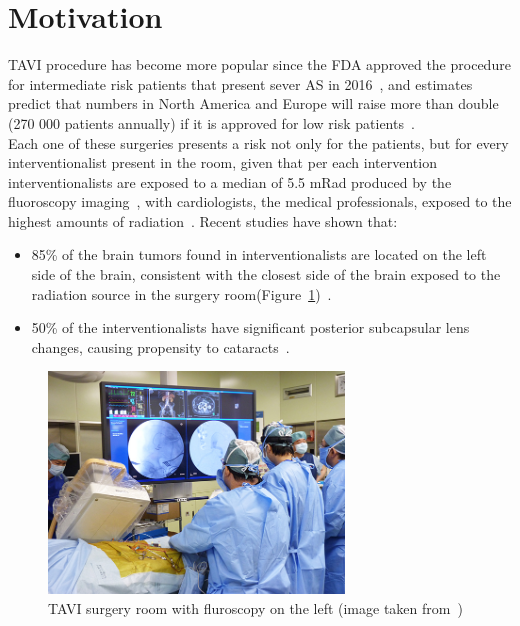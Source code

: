 \section{Motivation}\label{sec:motivation}

TAVI procedure has become more popular since the FDA approved the procedure for intermediate risk patients that present sever AS in 2016~\cite{tavi2019}, and estimates predict that numbers in North America and Europe will raise more than double (270 000 patients annually) if it is approved for low risk patients~\cite{taviprojection}.\\

Each one of these surgeries presents a risk not only for the patients, but for every interventionalist present in the room, given that per each intervention interventionalists are exposed to a median of 5.5 mRad produced by the fluoroscopy imaging~\cite{taviradiation}, with cardiologists, the medical professionals, exposed to the highest amounts of radiation~\cite{tavibrain}. Recent studies have shown that:
\begin{itemize}
 \item 	85\% of the brain tumors found in interventionalists are located on the left side of the brain, consistent with the closest side of the brain exposed to the radiation source in the surgery room(Figure~\ref{img:operationroom})~\cite{tavibrain}.
 \item 	50\% of the interventionalists have significant posterior subcapsular lens changes, causing propensity to cataracts~\cite{tavilens}.\\
\end{itemize}

\begin{figure}[ht]
   \centering
   \includegraphics[width=0.7\textwidth]{img/operationroom.PNG}
   \caption{TAVI surgery room with fluroscopy on the left (image taken from~\protect\cite{taviroom})}
   \label{img:operationroom}
\end{figure}

